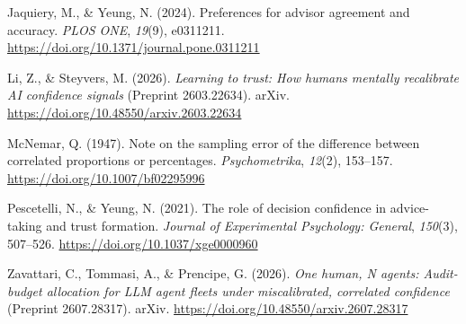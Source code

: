 \documentclass[
  british,
  11pt,
]{article}
\newlength{\cslhangindent}
\newenvironment{CSLReferences}[2] %
 {\begin{list}{}{%
  \setlength{\itemindent}{0pt}
  \setlength{\leftmargin}{0pt}
  \setlength{\parsep}{0pt}
  \ifodd #1
   \setlength{\leftmargin}{\cslhangindent}
   \setlength{\itemindent}{-1\cslhangindent}
  \fi
  \setlength{\itemsep}{#2\baselineskip}}}
 {\end{list}}
\begin{document}
\begin{CSLReferences}{1}{0}
Jaquiery, M., \& Yeung, N. (2024). Preferences for advisor agreement and
accuracy. \emph{PLOS ONE}, \emph{19}(9), e0311211.
\url{https://doi.org/10.1371/journal.pone.0311211}

Li, Z., \& Steyvers, M. (2026). \emph{Learning to trust: How humans
mentally recalibrate AI confidence signals} (Preprint 2603.22634).
arXiv. \url{https://doi.org/10.48550/arxiv.2603.22634}

McNemar, Q. (1947). Note on the sampling error of the difference between
correlated proportions or percentages. \emph{Psychometrika},
\emph{12}(2), 153--157. \url{https://doi.org/10.1007/bf02295996}

Pescetelli, N., \& Yeung, N. (2021). The role of decision confidence in
advice-taking and trust formation. \emph{Journal of Experimental
Psychology: General}, \emph{150}(3), 507--526.
\url{https://doi.org/10.1037/xge0000960}

Zavattari, C., Tommasi, A., \& Prencipe, G. (2026). \emph{One human, N
agents: Audit-budget allocation for LLM agent fleets under
miscalibrated, correlated confidence} (Preprint 2607.28317). arXiv.
\url{https://doi.org/10.48550/arxiv.2607.28317}

\end{CSLReferences}
\end{document}
